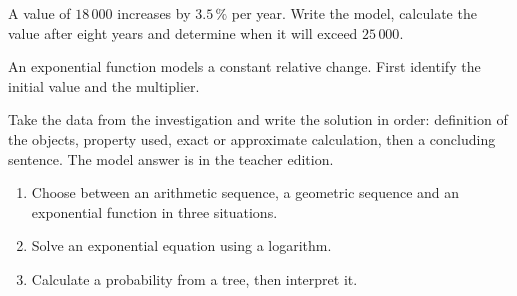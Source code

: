 \begin{activite}
A value of $18\,000$ increases by $3.5\,\%$ per year. Write the model, calculate the value after eight years and determine when it will exceed $25\,000$.
\begin{center}\end{center}
\end{activite}

\begin{traceecrite}An exponential function models a constant relative change. First identify the initial value and the multiplier.\end{traceecrite}

\begin{exemple}
Take the data from the investigation and write the solution in order: definition of the objects, property used, exact or approximate calculation, then a concluding sentence. The model answer is in the teacher edition.
\end{exemple}

\begin{exercice}[-- essential]
\begin{enumerate}\item Choose between an arithmetic sequence, a geometric sequence and an exponential function in three situations.\item Solve an exponential equation using a logarithm.\item Calculate a probability from a tree, then interpret it.\end{enumerate}
\end{exercice}


